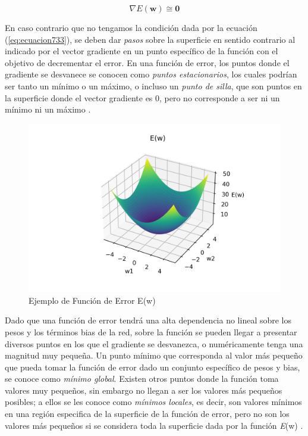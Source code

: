 {\begin{equation}
	\nabla{E(\textbf{w})} \cong \textbf{0}
	\label{eq:ecuacion733}
\end{equation}

En caso contrario que no tengamos la condición dada por la ecuación (\ref{eq:ecuacion733}), se deben dar \textit{pasos} sobre la superficie en sentido contrario al indicado por el vector gradiente en un punto específico de 
la función con el objetivo de decrementar el error. En una función de error, los puntos donde el gradiente se desvanece se conocen como \textit{puntos estacionarios}, los cuales podrían ser tanto un mínimo o un máximo, o 
incluso un \textit{punto de silla}, que son puntos en la superficie donde el vector gradiente es 0, pero no corresponde a ser ni un mínimo ni un máximo \cite{bishop}.

\begin{figure}[h]
	\centering
	\includegraphics[scale=1]{imgss220.png}
	\caption{Ejemplo de Función de Error E(w)}
	\label{fig:figura700_10}
\end{figure}

Dado que una función de error tendrá una alta dependencia no lineal sobre los pesos y los términos bias de la red, sobre la función se pueden llegar a presentar diversos puntos en los que el gradiente se desvanezca, o numéricamente 
tenga una magnitud muy pequeña. Un punto mínimo que corresponda al valor más pequeño que pueda tomar la función de error dado un conjunto específico de pesos y bias, se conoce como \textit{mínimo global}. Existen otros puntos 
donde la función toma valores muy pequeños, sin embargo no llegan a ser los valores más pequeños posibles; a ellos se les conoce como \textit{mínimos locales}, es decir, son valores mínimos en una región especifica
de la superficie de la función de error, pero no son los valores más pequeños si se considera toda la superficie dada por la función \textit{E}(w) \cite{bishop}.  

}
